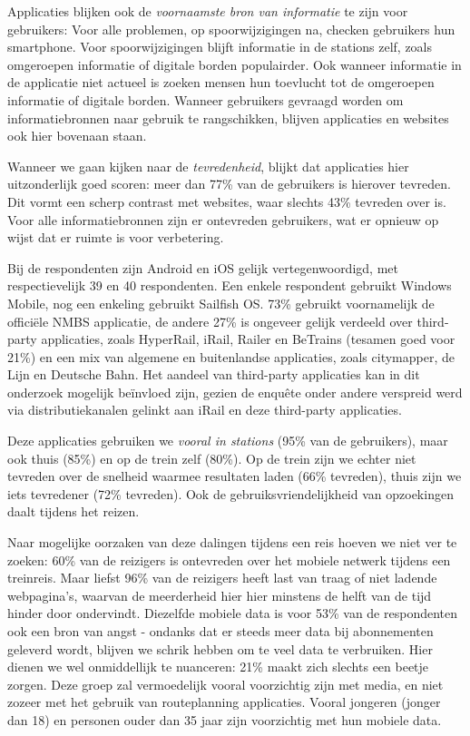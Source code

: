 Applicaties blijken ook de \emph{voornaamste bron van informatie} te zijn voor gebruikers: Voor alle problemen, op spoorwijzigingen na, checken gebruikers hun smartphone. Voor spoorwijzigingen blijft informatie in de stations zelf, zoals omgeroepen informatie of digitale borden populairder. Ook wanneer informatie in de applicatie niet actueel is zoeken mensen hun toevlucht tot de omgeroepen informatie of digitale borden. Wanneer gebruikers gevraagd worden om informatiebronnen naar gebruik te rangschikken, blijven applicaties en websites ook hier bovenaan staan.

Wanneer we gaan kijken naar de \emph{tevredenheid}, blijkt dat applicaties hier uitzonderlijk goed scoren: meer dan 77\% van de gebruikers is hierover tevreden. Dit vormt een scherp contrast met websites, waar slechts 43\% tevreden over is. Voor alle informatiebronnen zijn er ontevreden gebruikers, wat er opnieuw op wijst dat er ruimte is voor verbetering.

Bij de respondenten zijn Android en iOS gelijk vertegenwoordigd, met respectievelijk 39 en 40 respondenten. Een enkele respondent gebruikt Windows Mobile, nog een enkeling gebruikt Sailfish OS. 73\% gebruikt voornamelijk de officiële NMBS applicatie, de andere 27\% is ongeveer gelijk verdeeld over third-party applicaties, zoals HyperRail, iRail, Railer en BeTrains (tesamen goed voor 21\%) en een mix van algemene en buitenlandse applicaties, zoals citymapper, de Lijn en Deutsche Bahn. Het aandeel van third-party applicaties kan in dit onderzoek mogelijk beïnvloed zijn, gezien de enquête onder andere verspreid werd via distributiekanalen gelinkt aan iRail en deze third-party applicaties.

Deze applicaties gebruiken we \emph{vooral in stations} (95\% van de gebruikers), maar ook thuis (85\%) en op de trein zelf (80\%). Op de trein zijn we echter niet tevreden over de snelheid waarmee resultaten laden (66\% tevreden), thuis zijn we iets tevredener (72\% tevreden). Ook de gebruiksvriendelijkheid van opzoekingen daalt tijdens het reizen. 

Naar mogelijke oorzaken van deze dalingen tijdens een reis hoeven we niet ver te zoeken: 60\% van de reizigers is ontevreden over het mobiele netwerk tijdens een treinreis. Maar liefst 96\% van de reizigers heeft last van traag of niet ladende webpagina's, waarvan de meerderheid hier hier minstens de helft van de tijd hinder door ondervindt. Diezelfde mobiele data is voor 53\% van de respondenten ook een bron van angst - ondanks dat er steeds meer data bij abonnementen geleverd wordt, blijven we schrik hebben om te veel data te verbruiken. Hier dienen we wel onmiddellijk te nuanceren: 21\% maakt zich slechts een beetje zorgen. Deze groep zal vermoedelijk vooral voorzichtig zijn met media, en niet zozeer met het gebruik van routeplanning applicaties. Vooral jongeren (jonger dan 18) en personen ouder dan 35 jaar zijn voorzichtig met hun mobiele data.


